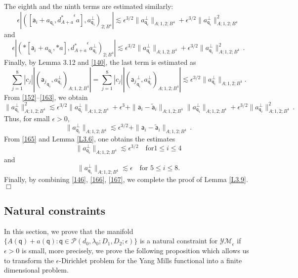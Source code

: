 \documentclass[11pt]{article}
\numberwithin{equation}{section} \setlength{\topmargin}{-35pt}
\newcommand{\PP}{\mathcal{P}}
\newcommand{\YMe}{\mathcal{YM}_{\epsilon}}
\newcommand{\q}{\mathsf{q}}
\newcommand{\A}{\mathsf{a}}
\begin{document}
The eighth and the ninth terms are estimated similarly:
\begin{equation}
\label{161}
\epsilon|([\A_i+a_{\q_i},{d_{A+a}^{\ast}}^{\epsilon}a],a_{\q_i}^{\perp})_{2;B^4}|
\lesssim\epsilon^{3/2}\|a_{\q_i}^{\perp}\|_{A;1,2;B^4}+\epsilon^{3/2}\|a_{\q_i}^{\perp}\|_{A;1,2;B^4}^2
\end{equation}
and
\begin{equation}
\label{162} \epsilon|(\ast[\A_i+a_{\q_i},\ast
a],{d_{A+a}^{\ast}}^{\epsilon}a_{\q_i}^{\perp})_{2;B^4}|
\lesssim\epsilon^{3/2}\|a_{\q_i}^{\perp}\|_{A;1,2;B^4}+\epsilon^{3/2}\|a_{\q_i}^{\perp}\|_{A;1,2;B^4}^2\,.
\end{equation}
Finally,  by Lemma 3.12 and \eqref{140}, the last term is estimated
as
\begin{equation}
\label{163}
\sum_{j=1}^8|c_j||({\A_j}_{\q_i},a_{\q_i}^{\perp})_{A;1,2;B^4}|=
\sum_{j=1}^8|c_j||({\A_j}_{\q_i}^{\perp},a_{\q_i}^{\perp})_{A;1,2;B^4}|
\lesssim\epsilon^{3/2}\|a_{\q_i}^{\perp}\|_{A;1,2;B^4}.
\end{equation}
From \eqref{152}--\eqref{163}, we obtain
\begin{equation}
\label{164}
\|a_{\q_i}^{\perp}\|_{A;1,2;B^4}^2\lesssim\epsilon^{3/2}\|a_{\q_i}^{\perp}\|_{A;1,2;B^4}+
\epsilon^3+\|\A_i-\tilde{\A}_i\|_{A;1,2;B^4}\|a_{\q_i}^{\perp}\|_{A;1,2;B^4}+
\epsilon^{3/2}\|a_{\q_i}^{\perp}\|_{A;1,2;B^4}^2\,.
\end{equation}
Thus, for small  $\epsilon>0$,
\begin{equation}
\label{165}
\|a_{\q_i}^{\perp}\|_{A;1,2;B^4}\lesssim\epsilon^{3/2}+\|\A_i-\tilde{\A}_i\|_{A;1,2;B^4}\,.
\end{equation}
From \eqref{165} and Lemma \ref{L3.6}, one obtains the estimates
\begin{equation}
\label{166}
\|a_{\q_i}^{\perp}\|_{A;1,2;B^4}\lesssim\epsilon^{3/2}\quad\text{for
$1\le i\le 4$}
\end{equation}
and
\begin{equation}
\label{167}
\|a_{\q_i}^{\perp}\|_{A;1,2;B^4}\lesssim\epsilon\quad\text{for $5\le
i\le 8$}.
\end{equation}
Finally, by combining \eqref{146}, \eqref{166}, \eqref{167}, we
complete the proof of Lemma \ref{L3.9}. \hfill$\Box$

\subsection{Natural constraints}

In this section, we prove that the manifold
$\{A(\q)+a(\q):\q\in\PP(d_0,\lambda_0;D_1,D_2;\epsilon)\}$ is a
natural constraint for $\YMe$ if $\epsilon>0$ is small, more
precisely, we prove the following proposition which allows us to
transform the $\epsilon$-Dirichlet problem for the Yang Mills
functional into a finite dimensional problem.
\end{document}
